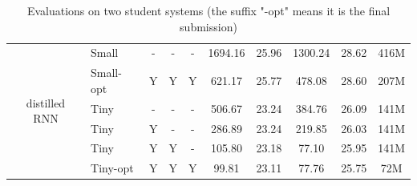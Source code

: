 \documentclass[11pt,a4paper]{article}
\begin{document}
\begin{table}[]
\begin{tabular}{clcccccccc}
\multirow{6}{*}{distilled RNN}   & Small     & -                                                                           & -                     & -                                                                         & 1694.16              & 25.96     & 1300.24              & 28.62     & 416M                        \\
                             & Small-opt & Y                                                                           & Y                     & Y                                                                         & 621.17               & 25.77     & 478.08               & 28.60     & 207M                        \\
                             & Tiny      & -                                                                           & -                     & -                                                                         & 506.67               & 23.24     & 384.76               & 26.09     & 141M                        \\
                             & Tiny      & Y                                                                           & -                     & -                                                                         & 286.89               & 23.24     & 219.85               & 26.03     & 141M                        \\
                             & Tiny      & Y                                                                           & Y                     & -                                                                         & 105.80               & 23.18     & 77.10                & 25.95     & 141M                        \\
                             & Tiny-opt  & Y                                                                           & Y                     & Y                                                                         & 99.81                & 23.11     & 77.76                & 25.75     & 72M                         \\ \hline
\end{tabular}
\caption{\small Evaluations on two student systems (the suffix "-opt" means it is the final submission)}
\label{table:score}
\end{table}
\end{document}
